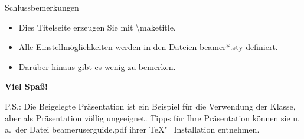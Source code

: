 \begin{frame}{Schlussbemerkungen}
  \begin{itemize}
  \item Dies Titelseite erzeugen Sie mit \textbackslash maketitle.
  \item Alle Einstellmöglichkeiten werden in den Dateien beamer*.sty definiert.
  \item Darüber hinaus gibt es wenig zu bemerken. 
  \end{itemize}
  

  \vfill
  \begin{block}{}
    \centerline{\huge\textbf{Viel Spaß!}}
  \end{block}
  \vfill P.S.: Die Beigelegte Präsentation ist ein Beispiel für die
  Verwendung der Klasse, aber als Präsentation völlig
  ungeeignet. Tipps für Ihre Präsentation können sie u.\,a.\ der Datei
  beameruserguide.pdf ihrer \TeX"=Installation entnehmen.
\end{frame}


